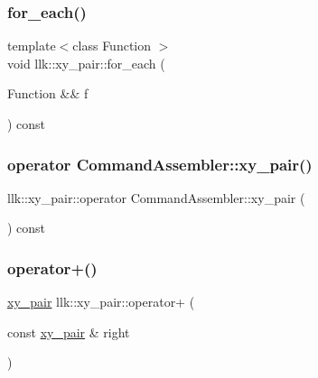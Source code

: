\subsubsection{\texorpdfstring{for\+\_\+each()}{for\_each()}}
{\footnotesize\ttfamily template$<$class Function $>$ \\
void llk\+::xy\+\_\+pair\+::for\+\_\+each (\begin{DoxyParamCaption}\item[{Function \&\&}]{f }\end{DoxyParamCaption}) const}

\mbox{\label{structllk_1_1xy__pair_afdde5bcb5672613be31f7cad5d798857}} 
\subsubsection{\texorpdfstring{operator Command\+Assembler\+::xy\+\_\+pair()}{operator CommandAssembler::xy\_pair()}}
{\footnotesize\ttfamily llk\+::xy\+\_\+pair\+::operator Command\+Assembler\+::xy\+\_\+pair (\begin{DoxyParamCaption}{ }\end{DoxyParamCaption}) const\hspace{0.3cm}{\ttfamily [inline]}}

\mbox{\label{structllk_1_1xy__pair_a43aa7e67327dbb79cd6d040ea77c0d04}} 
\subsubsection{\texorpdfstring{operator+()}{operator+()}}
{\footnotesize\ttfamily \hyperlink{structllk_1_1xy__pair}{xy\+\_\+pair} llk\+::xy\+\_\+pair\+::operator+ (\begin{DoxyParamCaption}\item[{const \hyperlink{structllk_1_1xy__pair}{xy\+\_\+pair} \&}]{right }\end{DoxyParamCaption})\hspace{0.3cm}{\ttfamily [inline]}}


